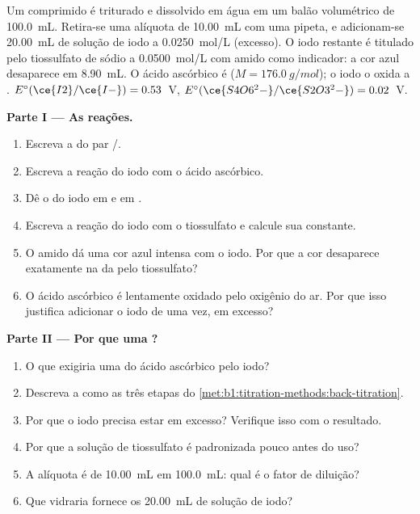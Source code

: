 \begin{problem}
\label{pb:b1:titration-methods:1}
Um comprimido é triturado e dissolvido em água em um balão volumétrico de
\qty{100.0}{mL}. Retira-se uma alíquota de \qty{10.00}{mL} com uma
pipeta, e adicionam-se \qty{20.00}{mL} de solução de iodo a
\qty{0.0250}{mol/L} (excesso). O iodo restante é titulado pelo
tiossulfato de sódio a \qty{0.0500}{mol/L} com amido como indicador: a
cor azul desaparece em \qty{8.90}{mL}. O ácido ascórbico é 
($M = \qty{176.0}{g/mol}$); o iodo o oxida a .
$E^\circ(\ce{I2}/\ce{I-}) = 0.53$~V,
$E^\circ(\ce{S4O6^2-}/\ce{S2O3^2-}) = 0.02$~V.

\medskip
\noindent\textbf{Parte I --- As reações.}
\begin{enumerate}
  \item Escreva a  do par /.
  \item Escreva a reação do iodo com o ácido ascórbico.
  \item Dê o  do iodo em  e em .
  \item Escreva a reação do iodo com o tiossulfato e calcule sua
        constante.
  \item O amido dá uma cor azul intensa com o iodo. Por que a cor
        desaparece exatamente na  da  pelo
        tiossulfato?
  \item O ácido ascórbico é lentamente oxidado pelo oxigênio do ar. Por
        que isso justifica adicionar o iodo de uma vez, em excesso?
\end{enumerate}

\medskip
\noindent\textbf{Parte II --- Por que uma ?}
\begin{enumerate}[resume]
  \item O que exigiria uma  do ácido ascórbico pelo iodo?
  \item Descreva a  como as três etapas do
        \cref{met:b1:titration-methods:back-titration}.
  \item Por que o iodo precisa estar em excesso? Verifique isso com o
        resultado.
  \item Por que a solução de tiossulfato é padronizada pouco antes do uso?
  \item A alíquota é de \qty{10.00}{mL} em \qty{100.0}{mL}: qual é o
        fator de diluição?
  \item Que vidraria fornece os \qty{20.00}{mL} de solução de iodo?
\end{enumerate}


\end{problem}
